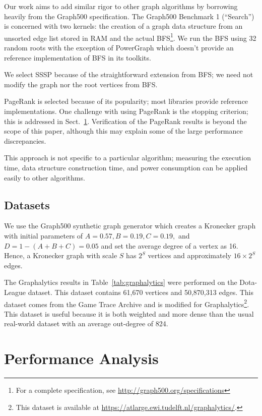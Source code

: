 \documentclass{llncs}
\begin{document}
Our work aims to add similar rigor to other graph algorithms by borrowing heavily from the Graph500 specification. The Graph500 Benchmark 1 (``Search'') is concerned with two kernels: the creation of a graph data structure from an unsorted edge list stored in RAM and the actual BFS\footnote{For a complete specification, see \url{http://graph500.org/specifications}}. We run the BFS using 32 random roots with the exception of PowerGraph which doesn't provide an reference implementation of BFS in its toolkits.

We select SSSP because of the straightforward extension from BFS; we need not modify the graph nor the root vertices from BFS.

PageRank is selected because of its popularity; most libraries provide reference implementations. One challenge with using PageRank is the stopping criterion; this is addressed in Sect.~\ref{sec:perf}. Verification of the PageRank results is beyond the scope of this paper, although this may explain some of the large performance discrepancies.

This approach is not specific to a particular algorithm; measuring the execution time, data structure construction time, and power consumption can be applied easily to other algorithms.

\subsection{Datasets}\label{sec:datasets}
We use the Graph500 synthetic graph generator which creates a Kronecker graph \cite{Leskovec:2010:Kronecker} with initial parameters of $A = 0.57, B = 0.19, C = 0.19,$ and $D = 1-(A+B+C) = 0.05$ and set the average degree of a vertex as 16. Hence, a Kronecker graph with scale $S$ has $2^S$ vertices and approximately $16 \times 2^S$ edges.

The Graphalytics results in Table~\ref{tab:graphalytics} were performed on the Dota-League dataset. This dataset contains 61,670 vertices and 50,870,313 edges. This dataset comes from the Game Trace Archive\cite{Guo:2012:GTA} and is modified for Graphalytics\footnote{This dataset is available at \url{https://atlarge.ewi.tudelft.nl/graphalytics/}.}. This dataset is useful because it is both weighted and more dense than the usual real-world dataset with an average out-degree of 824.

\section{Performance Analysis}\label{sec:perf}
\end{document}
